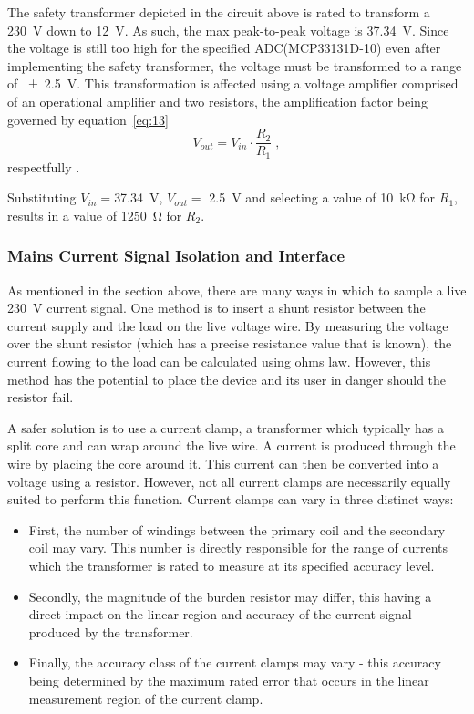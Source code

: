  The safety transformer depicted in the circuit above is rated to transform a \qty{230}{\volt} down to \qty{12}{\volt}. As such, the max peak-to-peak voltage is \qty{37.34}{\volt}. Since the voltage is still too high for the specified ADC(MCP33131D-10) even after implementing the safety transformer, the voltage must be transformed to a range of \qty{\pm 2.5}{\volt}. This transformation is affected using a voltage amplifier comprised of an operational amplifier and two resistors, the amplification factor being governed by equation~\ref{eq:13}
\begin{equation}
\label{eq:13}
    V_{out} = V_{in} \cdot \frac{R_{2}}{R_{1}} \;, 
\end{equation}
respectfully \cite{design_with}.

Substituting $V_{in} =$\qty{37.34}{\volt}, $V_{out} =$ \qty{2.5}{\volt} and selecting a value of \qty{10}{\kohm} for $R_{1}$, results in a value of \qty{1250}{\ohm} for $R_{2}$.

\subsubsection{Mains Current Signal Isolation and Interface}
\label{sec:D_I}
As mentioned in the section above, there are many ways in which to sample a live \qty{230}{\volt} current signal. One method is to insert a shunt resistor between the current supply and the load on the live voltage wire. By measuring the voltage over the shunt resistor (which has a precise resistance value that is known), the current flowing to the load can be calculated using ohms law. However, this method has the potential to place the device and its user in danger should the resistor fail.
\par
A safer solution is to use a current clamp, a transformer which typically has a split core and can wrap around the live wire. A current is produced through the wire by placing the core around it. This current can then be converted into a voltage using a resistor. However, not all current clamps are necessarily equally suited to perform this function. Current clamps can vary in three distinct ways:
\begin{itemize}
    \item First, the number of windings between the primary coil and the secondary coil may vary. This number is directly responsible for the range of currents which the transformer is rated to measure at its specified accuracy level. 
    \item Secondly, the magnitude of the burden resistor may differ, this having a direct impact on the linear region and accuracy of the current signal produced by the transformer. 
    \item Finally, the accuracy class of the current clamps may vary - this accuracy being determined by the maximum rated error that occurs in the linear measurement region of the current clamp.
\end{itemize}

